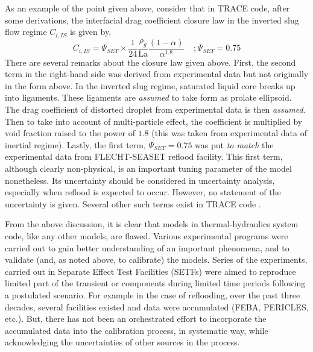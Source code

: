 \documentclass[11pt,titlepage]{article}
\begin{document}
As an example of the point given above, consider that in TRACE code, after some derivations, the interfacial drag coefficient closure law in the inverted slug flow regime $C_{i,IS}$ is given by,
\begin{equation}
C_{i,IS} = \Psi_{SET} \times \frac{1}{24}\frac{\rho_g}{\text{La}}\frac{(1-\alpha)}{\alpha^{1.8}} \; \; \; \; ;\Psi_{SET} = 0.75
\end{equation}
There are several remarks about the closure law given above. 
First, the second term in the right-hand side was derived from experimental data but not originally in the form above. 
In the inverted slug regime, saturated liquid core breaks up into ligaments. 
These ligaments are \emph{assumed} to take form as prolate ellipsoid. 
The drag coefficient of distorted droplet from experimental data is then \emph{assumed}. 
Then to take into account of multi-particle effect, the coefficient is multiplied by void fraction raised to the power of $1.8$ (this was taken from experimental data of inertial regime). 
Lastly, the first term, $\Psi_{SET} = 0.75$ was put \emph{to match} the experimental data from FLECHT-SEASET reflood facility. 
This first term, although clearly non-physical, is an important tuning parameter of the model nonetheless. 
Its uncertainty should be considered in uncertainty analysis, especially when reflood is expected to occur. 
However, no statement of the uncertainty is given. 
Several other such terms exist in TRACE code \cite{TraceTheory2012}.

From the above discussion, it is clear that models in thermal-hydraulics system code, like any other models, are flawed. 
Various experimental programs were carried out to gain better understanding of an important phenomena, and to validate (and, as noted above, to calibrate) the models. 
Series of the experiments, carried out in Separate Effect Test Facilities (SETFs) were aimed to reproduce limited part of the transient or components during limited time periods following a postulated scenario. 
For example in the case of reflooding, over the past three decades, several facilities existed and data were accumulated (FEBA, PERICLES, etc.). 
But, there has not been an orchestrated effort to incorporate the accumulated data into the calibration process, in systematic way, while acknowledging the uncertainties of other sources in the process. 

\end{document}
